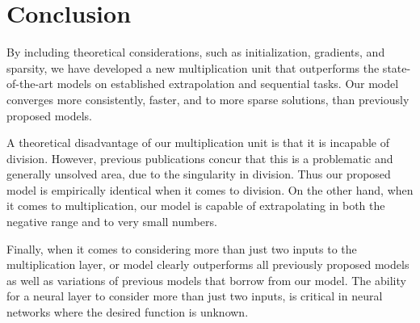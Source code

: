 \section{Conclusion}
By including theoretical considerations, such as initialization, gradients, and sparsity, we have developed a new multiplication unit that outperforms the state-of-the-art models on established extrapolation and sequential tasks. Our model converges more consistently, faster, and to more sparse solutions, than previously proposed models. 

A theoretical disadvantage of our multiplication unit is that it is incapable of division. However, previous publications concur that this is a problematic and generally unsolved area, due to the singularity in division. Thus our proposed model is empirically identical when it comes to division. On the other hand, when it comes to multiplication, our model is capable of extrapolating in both the negative range and to very small numbers.

Finally, when it comes to considering more than just two inputs to the multiplication layer, or model clearly outperforms all previously proposed models as well as variations of previous models that borrow from our model. The ability for a neural layer to consider more than just two inputs, is critical in neural networks where the desired function is unknown.